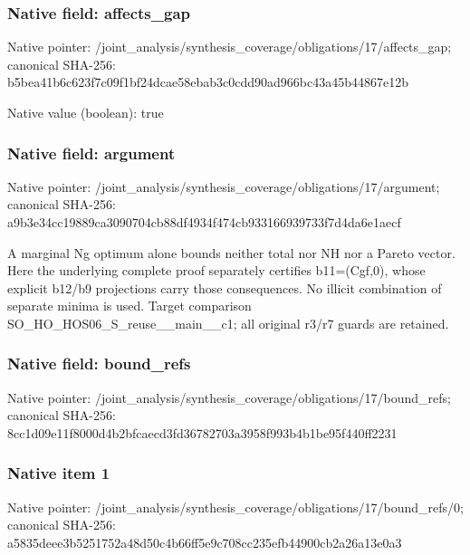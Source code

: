 \documentclass[10pt,a4paper]{article}
\begin{document}
\subsubsection{Native field: affects\_\allowbreak{}gap}
Native pointer: /joint\_\allowbreak{}analysis/synthesis\_\allowbreak{}coverage/obligations/17/affects\_\allowbreak{}gap; canonical SHA-256: b5bea41b6c623f7c09f1bf24dcae58ebab3c0cdd90ad966bc43a45b44867e12b

Native value (boolean): true

\subsubsection{Native field: argument}
Native pointer: /joint\_\allowbreak{}analysis/synthesis\_\allowbreak{}coverage/obligations/17/argument; canonical SHA-256: a9b3e34cc19889ca3090704cb88df4934f474cb933166939733f7d4da6e1aecf

\begingroup\raggedright\sloppy A marginal Ng optimum alone bounds neither total nor NH nor a Pareto vector. Here the underlying complete proof separately certifies b11=\allowbreak{}(Cgf,\allowbreak{}0),\allowbreak{} whose explicit b12/\allowbreak{}b9 projections carry those consequences. No illicit combination of separate minima is used. Target comparison SO\_\allowbreak{}HO\_\allowbreak{}HOS06\_\allowbreak{}S\_\allowbreak{}reuse\_\allowbreak{}\_\allowbreak{}main\_\allowbreak{}\_\allowbreak{}c1;\allowbreak{} all original r3/\allowbreak{}r7 guards are retained.\par\endgroup

\subsubsection{Native field: bound\_\allowbreak{}refs}
Native pointer: /joint\_\allowbreak{}analysis/synthesis\_\allowbreak{}coverage/obligations/17/bound\_\allowbreak{}refs; canonical SHA-256: 8cc1d09e11f8000d4b2bfcaecd3fd36782703a3958f993b4b1be95f440ff2231

\subsubsection{Native item 1}
Native pointer: /joint\_\allowbreak{}analysis/synthesis\_\allowbreak{}coverage/obligations/17/bound\_\allowbreak{}refs/0; canonical SHA-256: a5835deee3b5251752a48d50c4b66ff5e9c708cc235efb44900cb2a26a13e0a3
\end{document}
